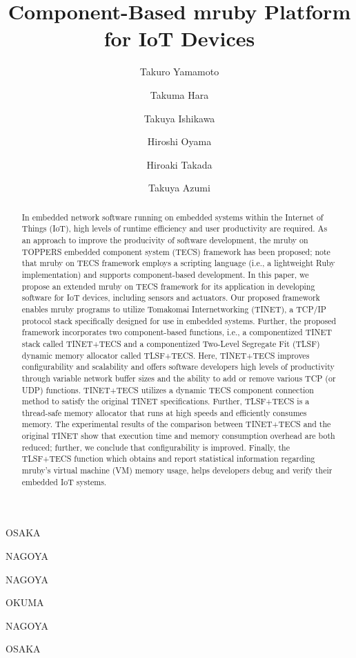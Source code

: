 \documentclass[JIP]{ipsj_v2/UTF8/ipsj}
\begin{document}
\title{Component-Based mruby Platform for IoT Devices}


\author{Takuro Yamamoto}{OSAKA}
\author{Takuma Hara}{NAGOYA}
\author{Takuya Ishikawa}{NAGOYA}
\author{Hiroshi Oyama}{OKUMA}
\author{Hiroaki Takada}{NAGOYA}
\author{Takuya Azumi}{OSAKA}


\begin{abstract}

In embedded network software running on embedded systems within the Internet of Things (IoT), high levels of runtime efficiency and user productivity are required.
As an approach to improve the producivity of software development, the mruby on TOPPERS embedded component system (TECS) framework has been proposed; note that mruby on TECS framework employs a scripting language (i.e., a lightweight Ruby implementation) and supports component-based development.
In this paper, we propose an extended mruby on TECS framework for its application in developing software for IoT devices, including sensors and actuators.
Our proposed framework enables mruby programs to utilize Tomakomai Internetworking (TINET), a TCP/IP protocol stack specifically designed for use in embedded systems.
Further, the proposed framework incorporates two component-based functions, i.e., a componentized TINET stack called TINET+TECS and a componentized Two-Level Segregate Fit (TLSF) dynamic memory allocator called TLSF+TECS.
Here, TINET+TECS improves configurability and scalability and offers software developers high levels of productivity through variable network buffer sizes and the ability to add or remove various TCP (or UDP) functions.
TINET+TECS utilizes a dynamic TECS component connection method to satisfy the original TINET specifications.
Further, TLSF+TECS is a thread-safe memory allocator that runs at high speeds and efficiently consumes memory.
The experimental results of the comparison between TINET+TECS and the original TINET show that execution time and memory consumption overhead are both reduced; further, we conclude that configurability is improved.
Finally, the TLSF+TECS function which obtains and report statistical information regarding mruby's virtual machine (VM) memory usage, helps developers debug and verify their embedded IoT systems.

\end{abstract}
\end{document}
